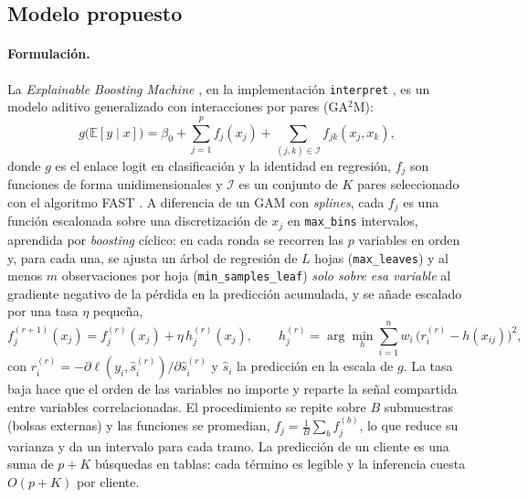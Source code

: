 \documentclass[pdflatex,sn-mathphys-num]{sn-jnl}
\begin{document}



\subsection{Modelo propuesto}\label{sec:propuesto}

\paragraph{Formulación.}
La \textit{Explainable Boosting Machine} \cite{lou2012intelligible,lou2013ga2m}, en la implementación \texttt{interpret} \cite{nori2019interpretml}, es un modelo aditivo generalizado con interacciones por pares (GA$^2$M):
\begin{equation}\label{eq:ebm}
g\big(\mathbb{E}[y\mid x]\big)=\beta_0+\sum_{j=1}^{p} f_j(x_j)+\sum_{(j,k)\in\mathcal{I}} f_{jk}(x_j,x_k),
\end{equation}
donde $g$ es el enlace logit en clasificación y la identidad en regresión, $f_j$ son funciones de forma unidimensionales y $\mathcal{I}$ es un conjunto de $K$ pares seleccionado con el algoritmo FAST \cite{lou2013ga2m}. A diferencia de un GAM con \textit{splines}, cada $f_j$ es una función escalonada sobre una discretización de $x_j$ en \texttt{max\_bins} intervalos, aprendida por \textit{boosting} cíclico: en cada ronda se recorren las $p$ variables en orden y, para cada una, se ajusta un árbol de regresión de $L$ hojas (\texttt{max\_leaves}) y al menos $m$ observaciones por hoja (\texttt{min\_samples\_leaf}) \emph{solo sobre esa variable} al gradiente negativo de la pérdida en la predicción acumulada, y se añade escalado por una tasa $\eta$ pequeña,
\begin{equation}\label{eq:boosting}
f_j^{(r+1)}(x_j)=f_j^{(r)}(x_j)+\eta\,h_j^{(r)}(x_j),\qquad h_j^{(r)}=\arg\min_{h}\sum_{i=1}^{n} w_i\,\big(r_i^{(r)}-h(x_{ij})\big)^2,
\end{equation}
con $r_i^{(r)}=-\partial\ell(y_i,\hat s_i^{(r)})/\partial\hat s_i^{(r)}$ y $\hat s_i$ la predicción en la escala de $g$. La tasa baja hace que el orden de las variables no importe y reparte la señal compartida entre variables correlacionadas. El procedimiento se repite sobre $B$ submuestras (bolsas externas) y las funciones se promedian, $f_j=\frac{1}{B}\sum_b f_j^{(b)}$, lo que reduce su varianza y da un intervalo para cada tramo. La predicción de un cliente es una suma de $p+K$ búsquedas en tablas: cada término es legible y la inferencia cuesta $O(p+K)$ por cliente.
\end{document}
